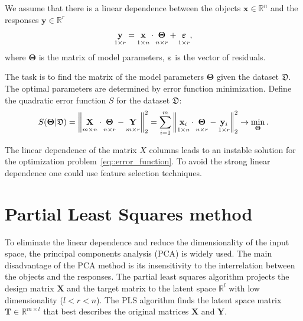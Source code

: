 \documentclass[12pt,twoside]{article}
\newcommand{\bx}{\mathbf{x}}
\newcommand{\by}{\mathbf{y}}
\newcommand{\bY}{\mathbf{Y}}
\newcommand{\bX}{\mathbf{X}}
\newcommand{\bT}{\mathbf{T}}
\newcommand{\bTheta}{\boldsymbol{\Theta}}
\begin{document}
We assume that there is a linear dependence between the objects $\bx \in \mathbb{R}^n$ and the responses $\by \in \mathbb{R}^r$
\begin{equation}
 \underset{1 \times r}{\by} = \underset{1 \times n}{\vphantom{\by}\bx} \cdot \underset{n \times r}{\vphantom{\by}\bTheta} + \underset{1 \times r}{\vphantom{\by}\boldsymbol{\varepsilon}}, 
\label{eq::model}
\end{equation}
where $\bTheta$ is the matrix of model parameters, $\boldsymbol{\varepsilon}$ is the vector of residuals.

The task is to find the matrix of the model parameters $\bTheta$ given the dataset $\mathfrak{D}$.
The optimal parameters are determined by error function minimization. 
Define the quadratic error function $S$ for the dataset $\mathfrak{D}$:
\begin{equation}
	S(\bTheta | \mathfrak{D}) = {\left\| \underset{m \times n}{\vphantom{\by}\mathbf{X}} \cdot \underset{n \times r}{\vphantom{\by}\bTheta} - \underset{m \times r}{\vphantom{\by}\mathbf{Y}} \right\| }_2^2 = \sum_{i=1}^m \left\| \underset{1 \times n}{\vphantom{\by}\bx_i} \cdot \underset{n \times r}{\vphantom{\by}\bTheta} - \underset{1 \times r}{\vphantom{\by}\by_i} \right\|_2^2 \rightarrow\min_{\bTheta}.
\label{eq::error_function}
\end{equation}
 
 The linear dependence of the matrix $X$ columns leads to an instable solution for the optimization problem~\eqref{eq::error_function}. 
 To avoid the strong linear dependence one could use feature selection techniques.

\section{Partial Least Squares method}

To eliminate the linear dependence and reduce the dimensionality of the input space, the principal components analysis (PCA) is widely used. 
The main disadvantage of the PCA method is its insensitivity to the interrelation between the objects and the responses.
The partial least squares algorithm projects the design matrix $\bX$ and the target matrix to the latent space $\mathbb{R}^l$ with low dimensionality ($l < r < n$).
The PLS algorithm finds the latent space matrix $\bT \in \mathbb{R}^{m \times l}$ that best describes the original matrices $\bX$ and $\bY$.
\end{document}
